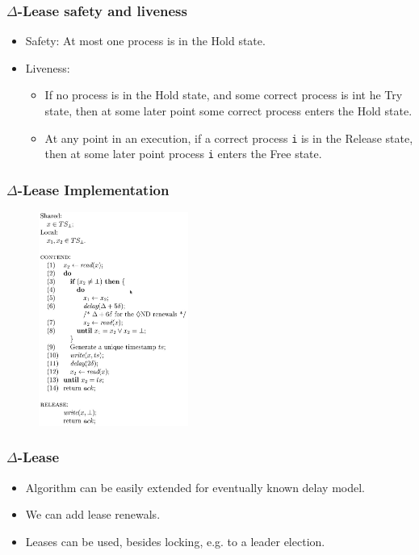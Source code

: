 \documentclass[10pt,utf8]{beamer}
\begin{document}
\begin{frame}
    \frametitle{$\Delta$-Lease safety and liveness}
    \begin{itemize}
     \item Safety: At most one process is in the Hold state.
     \item Liveness: 
     \begin{itemize}
        \item If no process is in the Hold state, and some correct process is int he Try state, then at some later point some correct process enters the Hold state.
        \item At any point in an execution, if a correct process \texttt{i} is in the Release state, then at some later point process \texttt{i} enters the Free state.
     \end{itemize}
    \end{itemize}
\end{frame}

\begin{frame}
    \frametitle{$\Delta$-Lease Implementation}
    \begin{figure}
        \centering
        \includegraphics[height=7cm]{./img/delta-lease-alg.eps}
    \end{figure}
\end{frame}

\begin{frame}
    \frametitle{$\Delta$-Lease}
    \begin{itemize}
     \item Algorithm can be easily extended for eventually known delay model.
     \item We can add lease renewals.
     \item Leases can be used, besides locking, e.g. to a leader election.
    \end{itemize}
\end{frame}
\end{document}
